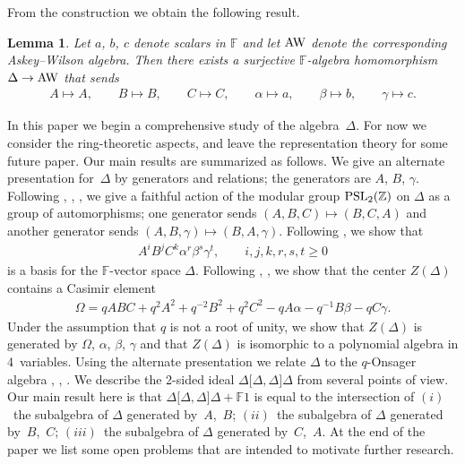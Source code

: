 \documentclass[pdftex]{sigma}
\numberwithin{equation}{section}
\newtheorem{Lemma}[Theorem]{Lemma}
\begin{document}
From the construction we obtain the following
result.

\begin{Lemma}
Let $a$, $b$, $c$ denote scalars in $\mathbb F$
and let
${\rm AW}$ denote the corresponding
Askey--Wilson algebra.
Then there exists a surjective $\mathbb F$-algebra
homomorphism $\Delta \to {\rm AW}$ that sends
\begin{gather*}
A \mapsto A,
\qquad
B \mapsto B,
\qquad
C \mapsto C,
\qquad
\alpha \mapsto a,
\qquad
\beta \mapsto b,
\qquad
\gamma \mapsto c.
\end{gather*}
\end{Lemma}


In this paper we begin a
comprehensive study of the algebra~$\Delta$. For now
we consider
the ring-theoretic aspects, and leave the
representation theory for some future paper.
Our main results are summarized as follows.
We give an alternate presentation for~$\Delta$
by generators and relations;
the generators are $A$, $B$, $\gamma$.
Following
\cite[Lemma~5.2]{Curt2},
\cite[Theorem~5.1]{dahater},
\cite{koro},
\cite[Section~1.2]{oblomkov}
we give a faithful action of the
modular group
${\rm  {PSL}}_2(\mathbb Z)$  on $\Delta$ as a group of automorphisms;
one generator sends $(A,B,C)\mapsto (B,C,A)$
and another generator sends $(A,B,\gamma) \mapsto (B,A,\gamma)$.
Following
\cite[Theorem~1]{posta2},
\cite[Proposition~6.6$(i)$]{jordan}
we show that
\begin{gather*}
A^iB^jC^k \alpha^r\beta^s\gamma^t,
\qquad   i,j,k,r,s,t \geq 0
\end{gather*}
is a basis for the $\mathbb F$-vector space
$\Delta$.
Following
\cite[Lemma~1]{posta2},
\cite[Proposition~3]{koro},
\cite[equa\-tion~(1.3)]{Zhidd}
we show that the center $Z(\Delta)$ contains a
Casimir element
\begin{gather}
\label{eq:caspreview}
\Omega =
qABC+q^2A^2+q^{-2}B^2+q^2C^2-qA\alpha-q^{-1}B\beta -q C\gamma.
\end{gather}
Under the assumption that $q$ is not a root of unity,
we
show that $Z(\Delta)$ is generated by
$\Omega$, $\alpha$, $\beta$, $\gamma$
and that $Z(\Delta)$ is isomorphic to a polynomial algebra in 4~variables.
Using the alternate presentation we  relate $\Delta$ to
the $q$-Onsager algebra
\cite[Section 4]{basnc},
\cite{IT:aug},
\cite[Def\/inition~3.9]{qSerre}.
We describe the 2-sided ideal
$\Delta\lbrack \Delta,\Delta\rbrack \Delta$ from several points of view.
Our main result here is that
$\Delta\lbrack \Delta,\Delta \rbrack \Delta + \mathbb F 1$
is equal to the intersection
of $(i)$~the subalgebra of $\Delta$ generated by~$A$,~$B$;
$(ii)$~the subalgebra of $\Delta$ generated by~$B$,~$C$;
$(iii)$~the subalgebra of $\Delta $ generated by~$C$,~$A$.
At the end of the paper we list some open problems
that are intended to
motivate further research.
\end{document}

